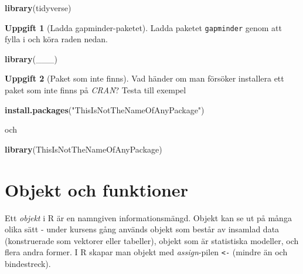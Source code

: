 \documentclass[
]{book}
\newenvironment{Shaded}{\begin{snugshade}}{\end{snugshade}}
\newcommand{\FunctionTok}[1]{\textcolor[rgb]{0.13,0.29,0.53}{\textbf{#1}}}
\newcommand{\NormalTok}[1]{#1}
\newcommand{\StringTok}[1]{\textcolor[rgb]{0.31,0.60,0.02}{#1}}
\theoremstyle{definition}
\theoremstyle{definition}
\theoremstyle{definition}
\newtheorem{exercise}{Uppgift}[chapter]
\theoremstyle{definition}
\theoremstyle{remark}
\begin{document}
\begin{Shaded}
\begin{Highlighting}[]
\FunctionTok{library}\NormalTok{(tidyverse)}
\end{Highlighting}
\end{Shaded}

\begin{exercise}[Ladda gapminder-paketet]

Ladda paketet \texttt{gapminder} genom att fylla i och köra raden nedan.

\begin{Shaded}
\begin{Highlighting}[]
\FunctionTok{library}\NormalTok{(\_\_\_)}
\end{Highlighting}
\end{Shaded}

\end{exercise}

\begin{exercise}[Paket som inte finns]

Vad händer om man försöker installera ett paket som inte finns på \emph{CRAN}? Testa till exempel

\begin{Shaded}
\begin{Highlighting}[]
\FunctionTok{install.packages}\NormalTok{(}\StringTok{"ThisIsNotTheNameOfAnyPackage"}\NormalTok{)}
\end{Highlighting}
\end{Shaded}

och

\begin{Shaded}
\begin{Highlighting}[]
\FunctionTok{library}\NormalTok{(ThisIsNotTheNameOfAnyPackage)}
\end{Highlighting}
\end{Shaded}

\end{exercise}

\section{Objekt och funktioner}\label{objekt-och-funktioner}

Ett \emph{objekt} i R är en namngiven informationsmängd. Objekt kan se ut på många olika sätt - under kursens gång används objekt som består av insamlad data (konstruerade som vektorer eller tabeller), objekt som är statistiska modeller, och flera andra former. I R skapar man objekt med \emph{assign}-pilen \texttt{\textless{}-} (mindre än och bindestreck).
\end{document}
